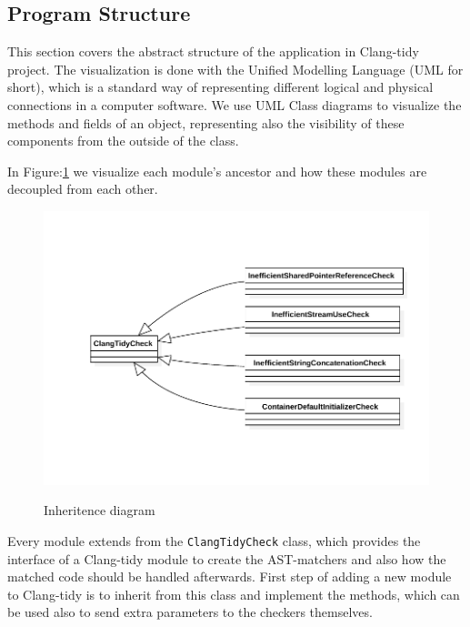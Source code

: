\subsection{Program Structure}
\par This section covers the abstract structure of the application in Clang-tidy project. The visualization is done with the Unified Modelling Language (UML for short), which is a standard way of representing different logical and physical connections in a computer software. We use UML Class diagrams to visualize the methods and fields of an object, representing also the visibility of these components from the outside of the class.  \medskip
\par In Figure:\ref{inheritence} we visualize each module's ancestor and how these modules are decoupled from each other.  
\begin{figure}[H]
 	\caption{Inheritence diagram}
 	\includegraphics[scale=1]{images/inheritence.pdf}
 	\label{inheritence}
\end{figure}
\par Every module extends from the \verb|ClangTidyCheck| class, which provides the interface of a Clang-tidy module to create the AST-matchers and also how the matched code should be handled afterwards. First step of adding a new module to Clang-tidy is to inherit from this class and implement the methods, which can be used also to send extra parameters to the checkers themselves.
